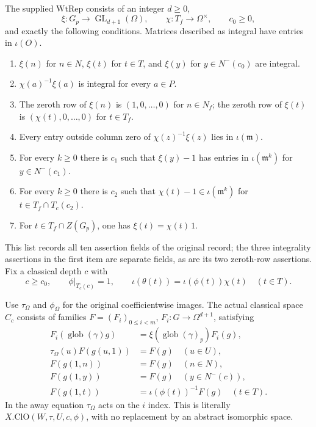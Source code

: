 The supplied $\mathrm{WtRep}$ consists of an integer $d\geq0$,
\[
 \xi:G_p\longrightarrow\operatorname{GL}_{d+1}(\Omega),\qquad
 \chi:T_f\longrightarrow\Omega^\times,\qquad c_0\geq0,
\]
and exactly the following conditions.  Matrices described as integral
have entries in $\iota(O)$.
\begin{enumerate}
\item $\xi(n)$ for $n\in N$, $\xi(t)$ for $t\in T$, and
$\xi(y)$ for $y\in N^-(c_0)$ are integral.
\item $\chi(a)^{-1}\xi(a)$ is integral for every $a\in P$.
\item The zeroth row of $\xi(n)$ is $(1,0,\ldots,0)$ for
$n\in N_f$; the zeroth row of $\xi(t)$ is
$(\chi(t),0,\ldots,0)$ for $t\in T_f$.
\item Every entry outside column zero of
$\chi(z)^{-1}\xi(z)$ lies in $\iota(\mathfrak m)$.
\item For every $k\geq0$ there is $c_1$ such that
$\xi(y)-1$ has entries in $\iota(\mathfrak m^k)$ for
$y\in N^-(c_1)$.
\item For every $k\geq0$ there is $c_2$ such that
$\chi(t)-1\in\iota(\mathfrak m^k)$ for
$t\in T_f\cap T_c(c_2)$.
\item For $t\in T_f\cap Z(G_p)$, one has
$\xi(t)=\chi(t)\,1$.
\end{enumerate}
This list records all ten assertion fields of the original record;
the three integrality assertions in the first item are separate fields,
as are its two zeroth-row assertions.  Fix a classical depth $c$ with
\begin{equation}\label{eq:oct-depth}
 c\geq c_0,\qquad \phi|_{T_c(c)}=1,\qquad
 \iota(\theta(t))=\iota(\phi(t))\chi(t)\quad(t\in T).
\end{equation}

Use $\tau_\Omega$ and $\phi_\Omega$ for the original coefficientwise
images.  The actual classical space $C_c$ consists of families
$F=(F_i)_{0\leq i<m}$, $F_i:G\to\Omega^{d+1}$, satisfying
\begin{align}
 F_i(\operatorname{glob}(\gamma)g)
      &=\xi(\operatorname{glob}(\gamma)_p)F_i(g),\\
 \tau_\Omega(u)F(g(u,1))&=F(g)\quad(u\in U),\\
 F(g(1,n))&=F(g)\quad(n\in N),\\
 F(g(1,y))&=F(g)\quad(y\in N^-(c)),\\
 F(g(1,t))&=\iota(\phi(t))^{-1}F(g)\quad(t\in T).
 \label{eq:oct-classical}
\end{align}
In the away equation $\tau_\Omega$ acts on the $i$ index.  This is
literally $X.\mathrm{ClO}(W,\tau,U,c,\phi)$, with no replacement by
an abstract isomorphic space.

